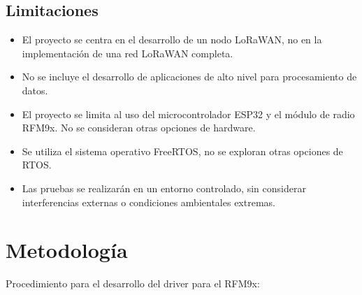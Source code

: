 \subsection{Limitaciones}

\begin{itemize}
   \item El proyecto se centra en el desarrollo de un nodo LoRaWAN, no en la implementación de una red LoRaWAN completa.
   \item No se incluye el desarrollo de aplicaciones de alto nivel para procesamiento de datos.
   \item El proyecto se limita al uso del microcontrolador ESP32 y el módulo de radio RFM9x. No se consideran otras opciones de hardware.
   \item Se utiliza el sistema operativo FreeRTOS, no se exploran otras opciones de RTOS.
    \item Las pruebas se realizarán en un entorno controlado, sin considerar interferencias externas o condiciones ambientales extremas.
\end{itemize}


\section{Metodología}

Procedimiento para el desarrollo del driver para el RFM9x:

